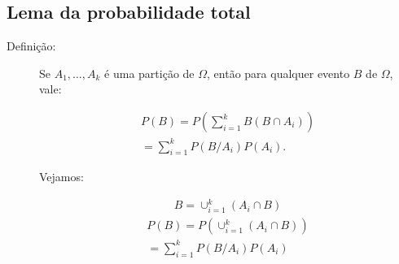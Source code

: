    \subsection{Lema da probabilidade total}
   \begin{description}
     \item [Definição:] Se $A_1,\ldots, A_k$ é uma partição de $\Omega$, então para qualquer evento $B$ de $\Omega$, vale:

       \begin{align}
         P(B)=P\left( \sum^k_{i=1} B(B \cap A_i ) \right)\\ \nonumber
         = \sum^k_{i=1} P(B/A_i)P(A_i).
       \end{align}

       Vejamos: 

       \begin{align}
         B=  \cup_{i=1}^k \left(A_i \cap B \right) 
       \end{align}
       \begin{align}
         P(B)=P \left(\cup_{i=1}^k \left(A_i \cap B\right)\right) \\ \nonumber
         = \sum \limits_{i=1}^k P(B/A_i)P(A_i)
       \end{align}
   \end{description}
